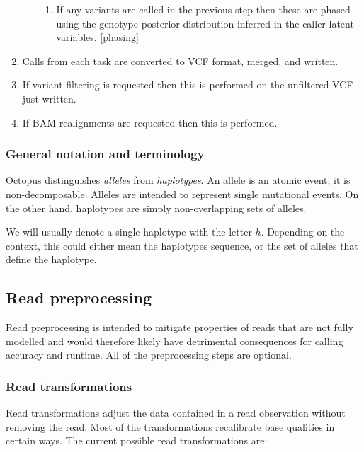 \documentclass{article}
\begin{document}
\begin{enumerate}
\begin{enumerate}
\begin{enumerate}
			\item If any variants are called in the previous step then these are phased using the genotype posterior distribution inferred in the caller latent variables. \ref{phasing}
		\end{enumerate}
	\end{enumerate}
	\item Calls from each task are converted to VCF format, merged, and written.
	\item If variant filtering is requested then this is performed on the unfiltered VCF just written.
	\item If BAM realignments are requested then this is performed.
\end{enumerate}

\subsubsection{General notation and terminology}

Octopus distinguishes \emph{alleles} from \emph{haplotypes}. An allele is an atomic event; it is non-decomposable. Alleles are intended to represent single mutational events. On the other hand, haplotypes are simply non-overlapping sets of alleles.

We will usually denote a single haplotype with the letter $h$. Depending on the context, this could either mean the haplotypes sequence, or the set of alleles that define the haplotype.

\subsection{Read preprocessing}\label{read-preprocess}

Read preprocessing is intended to mitigate properties of reads that are not fully modelled and would therefore likely have detrimental consequences for calling accuracy and runtime. All of the preprocessing steps are optional.

\subsubsection{Read transformations}

Read transformations adjust the data contained in a read observation without removing the read. Most of the transformations recalibrate base qualities in certain ways. The current possible read transformations are:
\end{document}
